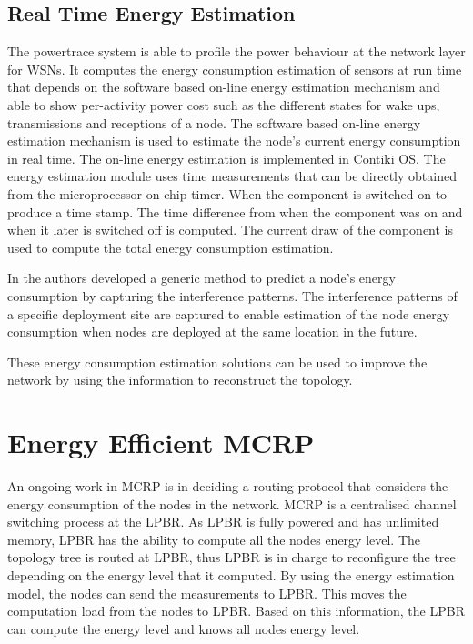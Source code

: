 \subsection{Real Time Energy Estimation}
The powertrace system \cite{dunkels2011powertrace} is able to profile the power behaviour at the network layer for WSNs. It computes the energy consumption estimation of sensors at run time that depends on the software based on-line energy estimation mechanism \cite{dunkels2007software} and able to show per-activity power cost such as the different states for wake ups, transmissions and receptions of a node.
The software based on-line energy estimation mechanism is used to estimate the node's current energy consumption in real time. The on-line energy estimation is implemented in Contiki OS. The energy estimation module uses time measurements that can be directly obtained from the microprocessor on-chip timer. When the component is switched on to produce a time stamp. The time difference from when the component was on and when it later is switched off is computed. The current draw of the component is used to compute the total energy consumption estimation.


In \cite{alexlifetime} the authors developed a generic method to predict a node's energy consumption by capturing the interference patterns. The interference patterns of a specific deployment site are captured to enable estimation of the node energy consumption when nodes are deployed at the same location in the future.

These energy consumption estimation solutions can be used to improve the network by using the information to reconstruct the topology.


\section{Energy Efficient MCRP}
An ongoing work in MCRP is in deciding a routing protocol that considers the energy consumption of the nodes in the network.
MCRP is a centralised channel switching process at the LPBR. As LPBR is fully powered and has unlimited memory, LPBR has the ability to compute all the nodes energy level. The topology tree is routed at LPBR, thus LPBR is in charge to reconfigure the tree depending on the energy level that it computed. By using the energy estimation model, the nodes can send the measurements to LPBR. This moves the computation load from the nodes to LPBR. Based on this information, the LPBR can compute the energy level and knows all nodes energy level.


